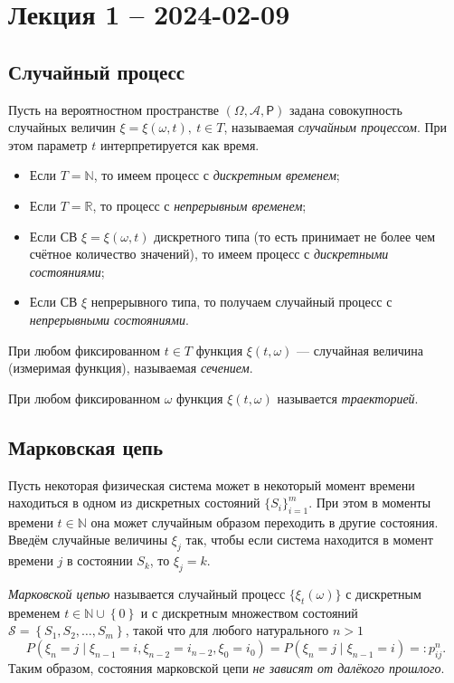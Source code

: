 \section{Лекция 1 -- 2024-02-09}
\subsection{Случайный процесс}
\begin{definition}
  Пусть на вероятностном пространстве $(\Omega, \mathscr A, \mathsf P)$ задана совокупность случайных величин
  $\xi = \xi(\omega, t),\ t \in T$, называемая \emph{случайным процессом}. При этом параметр 
  $t$ интерпретируется как время.

  \begin{itemize}[label=--]
    \item Если $T = \mathbb{N}$, то имеем процесс с \emph{дискретным временем};
    \item Если $T = \mathbb{R}$, то процесс с \emph{непрерывным временем};
    \item Если СВ $\xi=\xi(\omega, t)$ дискретного типа (то есть принимает не
      более чем счётное количество значений), то имеем процесс с \emph{дискретными состояниями};
    \item Если СВ $\xi$ непрерывного типа, то получаем случайный процесс с \emph{непрерывными состояниями}.
  \end{itemize}

  При любом фиксированном $t \in T$ функция $\xi(t, \omega)$ --- случайная
  величина (измеримая функция), называемая \emph{сечением}.

  При любом фиксированном $\omega$ функция $\xi(t, \omega)$ называется \emph{траекторией}.
\end{definition}


\subsection{Марковская цепь}
  Пусть некоторая физическая система может в некоторый момент времени находиться в одном из дискретных состояний
  $\{S_i\}_{i=1}^m$. При этом в моменты времени $t \in \mathbb{N}$ она может случайным образом
  переходить в другие состояния. Введём случайные величины $\xi_j$ так, чтобы если система
  находится в момент времени $j$ в состоянии $S_k$, то $\xi_j = k$.

\begin{definition}
  \emph{Марковской цепью} называется случайный процесс $\{\xi_t(\omega)\}$ с дискретным временем
  $t \in \mathbb{N} \cup \left\{ 0 \right\} $ и с дискретным множеством состояний
  $\mathscr{S} = \left\{ S_1, S_2, \dots, S_m \right\} $, такой что для любого
  натурального $ n > 1 $
  \[
    P(\xi_n = j \mid \xi_{n-1} = i, \xi_{n-2} = i_{n-2}, \xi_0 = i_0) =
    P(\xi_n=j \mid \xi_{n-1} = i) =: p_{ij}^n.
  \]
  Таким образом, состояния марковской цепи \textsl{не зависят от далёкого
  прошлого}.
\end{definition}

